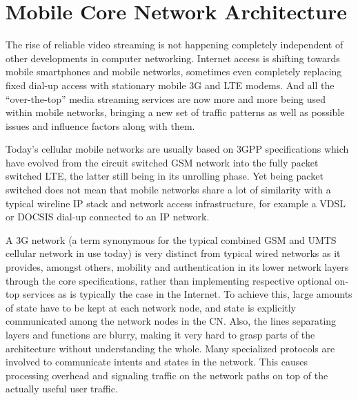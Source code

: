 \chapter{Mobile Core Network Architecture}
\label{chap:mobilenets}

The rise of reliable video streaming is not happening completely independent of other developments in computer networking. 
Internet access is shifting towards mobile smartphones and mobile networks, sometimes even completely replacing fixed dial-up access  with stationary mobile \gls{3G} and \gls{LTE} modems. And all the ``over-the-top'' media streaming services are now more and more being used within mobile networks, bringing a new set of traffic patterns as well as possible issues and influence factors along with them.

Today's cellular mobile networks are usually based on \gls{3GPP} specifications which have evolved from the circuit switched \gls{GSM} network into the fully packet switched \gls{LTE}, the latter still being in its unrolling phase. Yet being packet switched does not mean that mobile networks share a lot of similarity with a typical wireline \gls{IP} stack and network access infrastructure, for example a \gls{VDSL} or \gls{DOCSIS} dial-up connected to an \gls{IP} network. 

A \gls{3G} network (a term synonymous for the typical combined \gls{GSM} and \gls{UMTS} cellular network in use today) is very distinct from typical wired networks as it provides, amongst others, mobility and authentication in its lower network layers through the core specifications, rather than implementing respective optional on-top services as is typically the case in the Internet. To achieve this, large amounts of state have to be kept at each network node, and state is explicitly communicated among the network nodes in the \gls{CN}. Also, the lines separating layers and functions are blurry, making it very hard to grasp parts of the architecture without understanding the whole. Many specialized protocols are involved to communicate intents and states in the network. This causes processing overhead and signaling traffic on the network paths on top of the actually useful user traffic. 

